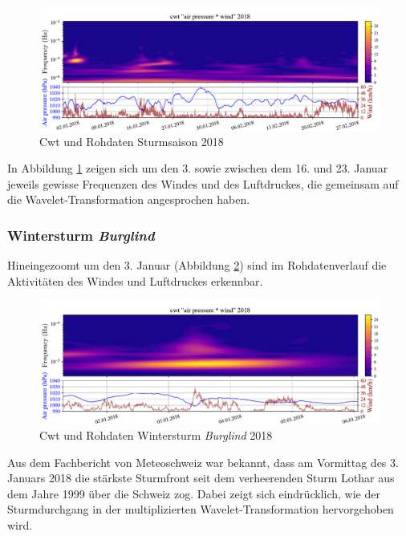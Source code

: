 \begin{refsection}
\begin{figure}[h]
	\centering
	\includegraphics[width=1\textwidth]{papers/wwt/images/storm_airp_wind.pdf}
	\caption{Cwt und Rohdaten Sturmsaison 2018}
	\label{fig:cwt_storm}
\end{figure}

In Abbildung \ref{fig:cwt_storm} \space zeigen sich um den 3. sowie zwischen dem 16. und 23. Januar jeweils gewisse Frequenzen des Windes und des Luftdruckes, die gemeinsam auf die Wavelet-Transformation angesprochen haben.

\subsubsection{Wintersturm {\em Burglind} }
\label{burglind}
Hineingezoomt um den 3. Januar (Abbildung \ref{fig:cwt_storm_zoom}) sind im Rohdatenverlauf die Aktivitäten des Windes und Luftdruckes erkennbar. 
\begin{figure}[b]
	\centering
	\includegraphics[width=1\textwidth]{papers/wwt/images/storm_airp_wind_zoom.pdf}
	\caption{Cwt und Rohdaten Wintersturm {\em Burglind}  2018}
	\label{fig:cwt_storm_zoom}
\end{figure}
Aus dem Fachbericht \space \cite{Fachbericht:Burglind} von Meteoschweiz war bekannt, dass am Vormittag des 3. Januars 2018 die stärkste Sturmfront seit dem verheerenden Sturm Lothar aus dem Jahre 1999 über die Schweiz zog.
Dabei zeigt sich eindrücklich, wie der Sturmdurchgang in der multiplizierten Wavelet-Transformation hervorgehoben wird.


\end{refsection}
